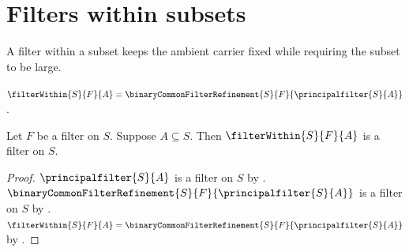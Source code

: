 \section{Filters within subsets}



A filter within a subset keeps the ambient carrier fixed while requiring the
subset to be large.

\begin{definition}\label{filter_within}
    $\filterWithin{S}{F}{A}
        =\binaryCommonFilterRefinement{S}{F}{\principalfilter{S}{A}}$.
\end{definition}

\begin{proposition}\label{filter_within_is_filter}
    Let $F$ be a filter on $S$.
    Suppose $A\subseteq S$.
    Then $\filterWithin{S}{F}{A}$ is a filter on $S$.
\end{proposition}
\begin{proof}
    $\principalfilter{S}{A}$ is a filter on $S$ by
        .
    $\binaryCommonFilterRefinement{S}{F}{\principalfilter{S}{A}}$ is a
        filter on $S$ by .
    $\filterWithin{S}{F}{A}
        =\binaryCommonFilterRefinement{S}{F}{\principalfilter{S}{A}}$ by
        .
\end{proof}

